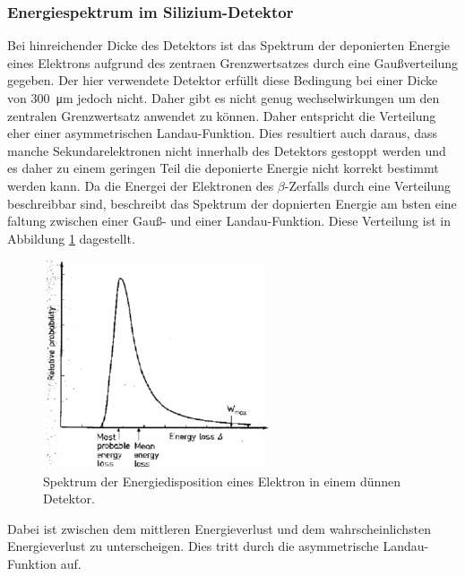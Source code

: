 \subsubsection{Energiespektrum im Silizium-Detektor}
Bei hinreichender Dicke des Detektors ist das Spektrum der deponierten Energie eines
Elektrons aufgrund des zentraen Grenzwertsatzes durch eine Gaußverteilung gegeben.
Der hier verwendete Detektor erfüllt diese Bedingung bei einer Dicke von
\SI{300}{\micro\meter} jedoch nicht. Daher gibt es nicht genug wechselwirkungen
um den zentralen Grenzwertsatz anwendet zu können. Daher entspricht die Verteilung
eher einer asymmetrischen Landau-Funktion. Dies resultiert auch daraus, dass manche
Sekundarelektronen nicht innerhalb des Detektors gestoppt werden und es daher zu
einem geringen Teil die deponierte Energie nicht korrekt bestimmt werden kann.
Da die Energei der Elektronen des $\beta$-Zerfalls durch eine Verteilung beschreibbar
sind, beschreibt das Spektrum der dopnierten Energie am bsten eine faltung zwischen
einer Gauß- und einer Landau-Funktion. Diese Verteilung ist in Abbildung \ref{fig:faltung}
dagestellt.
\begin{figure}[htb]
  \centering
  \includegraphics[width=0.6\textwidth]{images/Landau.png}
  \caption{Spektrum der Energiedisposition eines Elektron in einem dünnen Detektor. \cite{anleitung}}
  \label{fig:faltung}
\end{figure}

Dabei ist zwischen dem mittleren Energieverlust und dem wahrscheinlichsten Energieverlust
zu unterscheigen. Dies tritt durch die asymmetrische Landau-Funktion auf.
